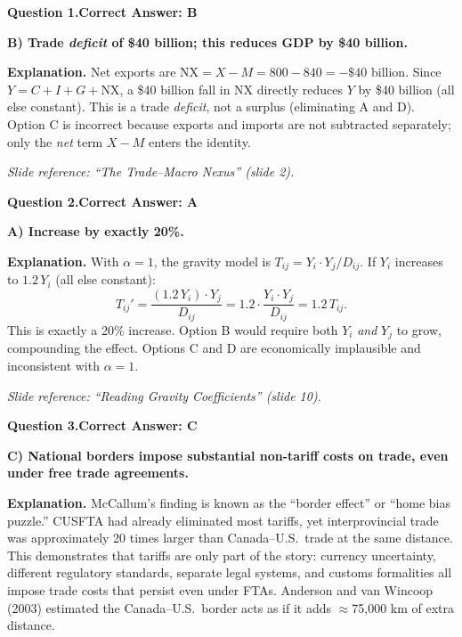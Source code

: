 \documentclass[11pt]{article}
\begin{document}
\bigskip

\noindent\textbf{Question 1.}\quad\textbf{Correct Answer: B}

\begin{correctbox}
\textbf{B) Trade \emph{deficit} of \$40 billion; this reduces GDP by \$40 billion.}
\end{correctbox}

\medskip
\noindent\textbf{Explanation.}\enspace
Net exports are $\text{NX} = X - M = 800 - 840 = -\$40$ billion. Since
$Y = C + I + G + \text{NX}$, a \$40 billion fall in NX directly reduces
$Y$ by \$40 billion (all else constant). This is a trade \emph{deficit}, not a
surplus (eliminating A and D). Option C is incorrect because exports and
imports are not subtracted separately; only the \emph{net} term $X - M$ enters
the identity.

\textit{Slide reference: ``The Trade--Macro Nexus'' (slide 2).}

\bigskip

\noindent\textbf{Question 2.}\quad\textbf{Correct Answer: A}

\begin{correctbox}
\textbf{A) Increase by exactly 20\%.}
\end{correctbox}

\medskip
\noindent\textbf{Explanation.}\enspace
With $\alpha = 1$, the gravity model is $T_{ij} = Y_i\cdot Y_j / D_{ij}$.
If $Y_i$ increases to $1.2\,Y_i$ (all else constant):
\[T_{ij}' = \frac{(1.2\,Y_i)\cdot Y_j}{D_{ij}} = 1.2 \cdot \frac{Y_i\cdot Y_j}{D_{ij}} = 1.2\,T_{ij}.\]
This is exactly a 20\% increase. Option B would require both $Y_i$ \emph{and}
$Y_j$ to grow, compounding the effect. Options C and D are economically
implausible and inconsistent with $\alpha = 1$.

\textit{Slide reference: ``Reading Gravity Coefficients'' (slide 10).}

\bigskip

\noindent\textbf{Question 3.}\quad\textbf{Correct Answer: C}

\begin{correctbox}
\textbf{C) National borders impose substantial non-tariff costs on trade, even under free trade agreements.}
\end{correctbox}

\medskip
\noindent\textbf{Explanation.}\enspace
McCallum's finding is known as the ``border effect'' or ``home bias puzzle.''
CUSFTA had already eliminated most tariffs, yet interprovincial trade was
approximately 20 times larger than Canada--U.S.\ trade at the same distance.
This demonstrates that tariffs are only part of the story: currency uncertainty,
different regulatory standards, separate legal systems, and customs formalities
all impose trade costs that persist even under FTAs. Anderson and van Wincoop
(2003) estimated the Canada--U.S.\ border acts as if it adds $\approx$75,000 km
of extra distance.
\end{document}
